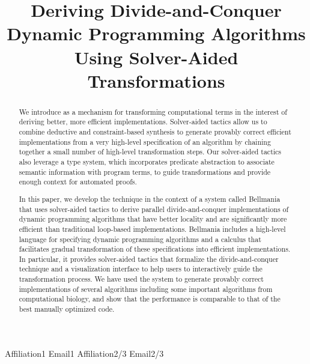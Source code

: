 \documentclass{sigplanconf}
\begin{document}




\title{Deriving Divide-and-Conquer Dynamic Programming Algorithms Using 
  Solver-Aided Transformations}

           {Affiliation1}
           {Email1}
           {Affiliation2/3}
           {Email2/3}

\maketitle

\begin{abstract}
We introduce  as a mechanism for transforming
computational terms 
in the interest of deriving better, more efficient
implementations. 
Solver-aided tactics allow us to combine deductive and constraint-based synthesis to generate provably correct efficient implementations from a very high-level specification of an algorithm by chaining together a small number of high-level transformation steps. Our solver-aided tactics also leverage a type system, which incorporates predicate abstraction to associate semantic information with program terms, to guide transformations and provide enough context for automated proofs. 

In this paper, we develop the technique in the context of a system called Bellmania that uses solver-aided tactics to derive parallel divide-and-conquer implementations of dynamic programming algorithms that have better locality and are significantly more efficient than traditional loop-based implementations. Bellmania includes a high-level language for specifying dynamic programming algorithms and a calculus that facilitates gradual transformation of these specifications into efficient implementations. In particular, it provides solver-aided tactics that formalize the divide-and-conquer technique and a visualization interface to help users to interactively guide the transformation process. 
We have used the system to generate provably correct implementations of several algorithms including some important algorithms from computational biology, and show that the performance is comparable to that of the best manually optimized code.
\end{abstract}
\end{document}
